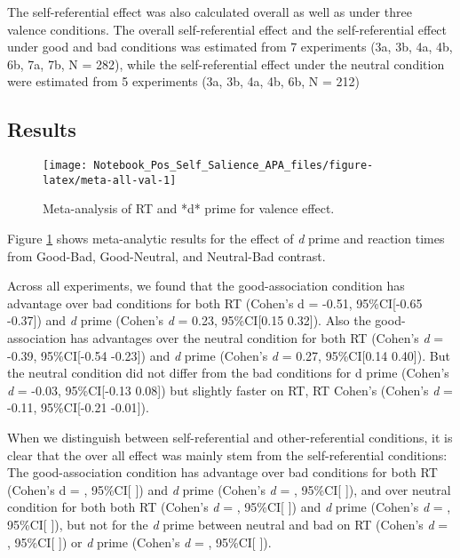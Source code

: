 \documentclass[man]{apa6}
\begin{document}
The self-referential effect was also calculated overall as well as under three valence conditions. The overall self-referential effect and the self-referential effect under good and bad conditions was estimated from 7 experiments (3a, 3b, 4a, 4b, 6b, 7a, 7b, N = 282), while the self-referential effect under the neutral condition were estimated from 5 experiments (3a, 3b, 4a, 4b, 6b, N = 212)

\hypertarget{results-11}{%
\subsection{Results}\label{results-11}}

\begin{figure}

{\centering \texttt{[image: Notebook\_Pos\_Self\_Salience\_APA\_files/figure-latex/meta-all-val-1]} 

}

\caption{Meta-analysis of RT and *d* prime for valence effect.}\label{fig:meta-all-val}
\end{figure}

Figure \ref{fig:meta-all-val} shows meta-analytic results for the effect of \emph{d} prime and reaction times from Good-Bad, Good-Neutral, and Neutral-Bad contrast.

Across all experiments, we found that the good-association condition has advantage over bad conditions for both RT (Cohen's d = -0.51, 95\%CI{[}-0.65 -0.37{]}) and \emph{d} prime (Cohen's \emph{d} = 0.23, 95\%CI{[}0.15 0.32{]}). Also the good-association has advantages over the neutral condition for both RT (Cohen's \emph{d} = -0.39, 95\%CI{[}-0.54 -0.23{]}) and \emph{d} prime (Cohen's \emph{d} = 0.27, 95\%CI{[}0.14 0.40{]}). But the neutral condition did not differ from the bad conditions for d prime (Cohen's \emph{d} = -0.03, 95\%CI{[}-0.13 0.08{]}) but slightly faster on RT, RT Cohen's (Cohen's \emph{d} = -0.11, 95\%CI{[}-0.21 -0.01{]}).

When we distinguish between self-referential and other-referential conditions, it is clear that the over all effect was mainly stem from the self-referential conditions: The good-association condition has advantage over bad conditions for both RT (Cohen's d = , 95\%CI{[} {]}) and \emph{d} prime (Cohen's \emph{d} = , 95\%CI{[} {]}), and over neutral condition for both both RT (Cohen's \emph{d} = , 95\%CI{[} {]}) and \emph{d} prime (Cohen's \emph{d} = , 95\%CI{[} {]}), but not for the \emph{d} prime between neutral and bad on RT (Cohen's \emph{d} = , 95\%CI{[} {]}) or \emph{d} prime (Cohen's \emph{d} = , 95\%CI{[} {]}).
\end{document}
